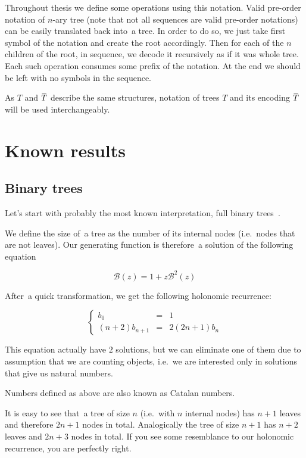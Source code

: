 \documentclass[final]{article}
\theoremstyle{definition}
\theoremstyle{definition}
\theoremstyle{remark}
\newcommand{\ols}[1]{\mskip.5\thinmuskip\overline{\mskip-.5\thinmuskip {#1} \mskip-.5\thinmuskip}\mskip.5\thinmuskip} %
\newcommand{\gf}[1]{\ensuremath{\mathcal{#1}}}
\newcommand{\enc}[1]{\ensuremath{\ols{#1}}}
\begin{document}
Throughout thesis we define some operations using this notation. Valid pre-order notation of \(n\)-ary tree (note that not all sequences are valid pre-order notations) can be easily translated back into~a tree. In order to do so, we just take first symbol of the notation and create the root accordingly. Then for each of the \(n\) children of the root, in sequence, we decode it recursively as if it was whole tree. Each such operation consumes some prefix of the notation. At the end we should be left with no symbols in the sequence.

As \(T\) and \(\enc{T}\) describe the same structures, notation of trees \(T\) and its encoding \(\enc{T}\) will be used interchangeably.

\section{Known results}%
\label{sec:known_results}

\subsection{Binary trees}%
\label{sub:binary_trees}

Let's start with probably the most known interpretation, full binary trees~\cite{binary}.

We define the size of~a tree as the number of its internal nodes (i.e.~nodes that are not leaves). Our generating function is therefore~a solution of the following equation

\[\gf{B}(z) = 1 + z\gf{B}^2(z)\]

After~a quick transformation, we get the following holonomic recurrence:

\[\left\{\begin{array}{rcl}
            b_0 &=& 1\\
            (n + 2)b_{n + 1} &=& 2 (2n + 1)b_n
\end{array}\right.\]

This equation actually have \(2\) solutions, but we can eliminate one of them due to assumption that we are counting objects, i.e.~we are interested only in solutions that give us natural numbers.

Numbers defined as above are also known as Catalan numbers.

It is easy to see that~a tree of size \(n\) (i.e.~with \(n\) internal nodes) has \(n + 1\) leaves and therefore \(2n + 1\) nodes in total. Analogically the tree of size \(n + 1\) has \(n + 2\) leaves and \(2n + 3\) nodes in total. If you see some resemblance to our holonomic recurrence, you are perfectly right.
\end{document}
